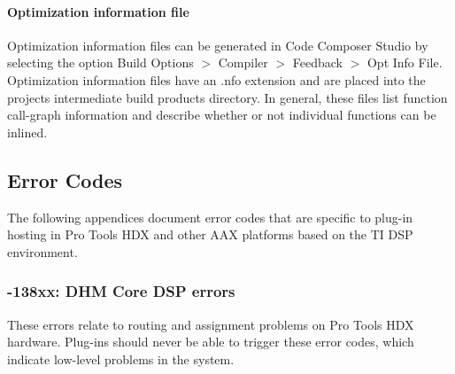 \hypertarget{a00832_subsubsection__optimization_information_file_}{}\paragraph{Optimization information file}\label{a00832_subsubsection__optimization_information_file_}
 Optimization information files can be generated in Code Composer Studio by selecting the option Build Options $>$ Compiler $>$ Feedback $>$ Opt Info File. Optimization information files have an .nfo extension and are placed into the project\textquotesingle{}s intermediate build products directory. In general, these files list function call-\/graph information and describe whether or not individual functions can be inlined. 

 \hypertarget{a00832_aax_ti_guide_07_error_codes}{}\subsection{Error Codes}\label{a00832_aax_ti_guide_07_error_codes}
The following appendices document error codes that are specific to plug-\/in hosting in Pro Tools H\+DX and other A\+AX platforms based on the TI D\+SP environment.

\hypertarget{a00832_subsection__138xx_dhm_core_dsp_errors}{}\subsubsection{-\/138xx\+: D\+H\+M Core D\+S\+P errors}\label{a00832_subsection__138xx_dhm_core_dsp_errors}
 These errors relate to routing and assignment problems on Pro Tools H\+DX hardware. Plug-\/ins should never be able to trigger these error codes, which indicate low-\/level problems in the system.


